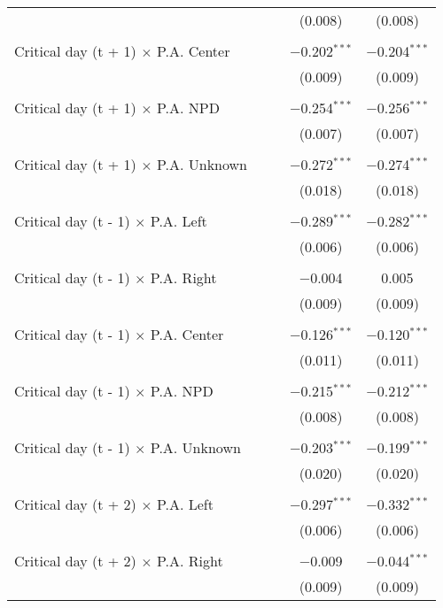 \documentclass[
]{article}
\begin{document}
\begin{table}[!htbp]
{\begin{tabular}{@{\extracolsep{5pt}}lcccc}
  &  &  & (0.008) & (0.008) \\ 
  & & & & \\ 
 Critical day (t + 1) $\times$ P.A. Center &  &  & $-$0.202$^{***}$ & $-$0.204$^{***}$ \\ 
  &  &  & (0.009) & (0.009) \\ 
  & & & & \\ 
 Critical day (t + 1) $\times$ P.A. NPD &  &  & $-$0.254$^{***}$ & $-$0.256$^{***}$ \\ 
  &  &  & (0.007) & (0.007) \\ 
  & & & & \\ 
 Critical day (t + 1) $\times$ P.A. Unknown &  &  & $-$0.272$^{***}$ & $-$0.274$^{***}$ \\ 
  &  &  & (0.018) & (0.018) \\ 
  & & & & \\ 
 Critical day (t - 1) $\times$ P.A. Left &  &  & $-$0.289$^{***}$ & $-$0.282$^{***}$ \\ 
  &  &  & (0.006) & (0.006) \\ 
  & & & & \\ 
 Critical day (t - 1) $\times$ P.A. Right &  &  & $-$0.004 & 0.005 \\ 
  &  &  & (0.009) & (0.009) \\ 
  & & & & \\ 
 Critical day (t - 1) $\times$ P.A. Center &  &  & $-$0.126$^{***}$ & $-$0.120$^{***}$ \\ 
  &  &  & (0.011) & (0.011) \\ 
  & & & & \\ 
 Critical day (t - 1) $\times$ P.A. NPD &  &  & $-$0.215$^{***}$ & $-$0.212$^{***}$ \\ 
  &  &  & (0.008) & (0.008) \\ 
  & & & & \\ 
 Critical day (t - 1) $\times$ P.A. Unknown &  &  & $-$0.203$^{***}$ & $-$0.199$^{***}$ \\ 
  &  &  & (0.020) & (0.020) \\ 
  & & & & \\ 
 Critical day (t + 2) $\times$ P.A. Left &  &  & $-$0.297$^{***}$ & $-$0.332$^{***}$ \\ 
  &  &  & (0.006) & (0.006) \\ 
  & & & & \\ 
 Critical day (t + 2) $\times$ P.A. Right &  &  & $-$0.009 & $-$0.044$^{***}$ \\ 
  &  &  & (0.009) & (0.009) \\ 

\end{tabular}}
\end{table}
\end{document}
